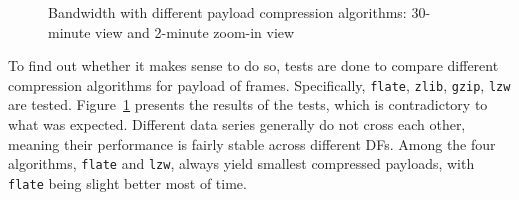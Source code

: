 \documentclass[12pt]{report}
\begin{document}
\begin{figure}[htb]
  \caption{\label{fig:cmp}Bandwidth with different payload compression algorithms: 30-minute view and 2-minute zoom-in view}
\end{figure}

To find out whether it makes sense to do so, tests are done to compare different compression algorithms for payload of frames. Specifically, \texttt{flate}, \texttt{zlib}, \texttt{gzip}, \texttt{lzw} are tested. Figure~\ref{fig:cmp} presents the results of the tests, which is contradictory to what was expected. Different data series generally do not cross each other, meaning their performance is fairly stable across different DFs. Among the four algorithms, \texttt{flate} and \texttt{lzw}, always yield smallest compressed payloads, with \texttt{flate} being slight better most of time.
\end{document}
